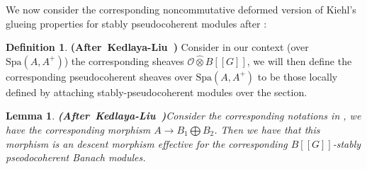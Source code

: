 \documentclass[12pt]{amsart}
\newtheorem{lemma}[theorem]{Lemma}
\theoremstyle{definition}
\newtheorem{definition}[theorem]{Definition}
\numberwithin{equation}{section}
\begin{document}
\indent We now consider the corresponding noncommutative deformed version of Kiehl's glueing properties for stably pseudocoherent modules after \cite{KL2}:



\begin{definition} \mbox{\bf{(After Kedlaya-Liu \cite[Definition 2.5.3]{KL2})}}
Consider in our context (over $\mathrm{Spa}(A,A^+)$) the corresponding sheaves $\mathcal{O}\widehat{\otimes}B[[G]]$, we will then define the corresponding pseudocoherent sheaves over $\mathrm{Spa}(A,A^+)$ to be those locally defined by attaching stably-pseudocoherent modules over the section. 
\end{definition}



\begin{lemma} \mbox{\bf{(After Kedlaya-Liu \cite[Lemma 2.5.4]{KL2})}}\label{lemma3.14}
	Consider the corresponding notations in \cite[Lemma 2.4.10]{KL2}, we have the corresponding morphism $A\rightarrow B_1\bigoplus B_2$. Then we have that this morphism is an descent morphism effective for the corresponding $B[[G]]$-stably pseodocoherent Banach modules. 
\end{lemma}
\end{document}
